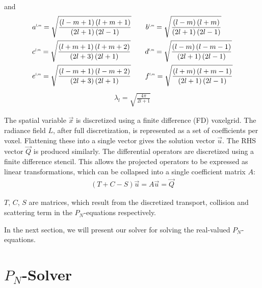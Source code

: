 and
\begin{align*}
&
a^{\scaleto{l,m}{4pt}}= \sqrt{\frac{\left(l-m+1\right)\left(l+m+1\right)}{\left(2l+1\right)\left(2l-1\right)}} \qquad
b^{\scaleto{l,m}{4pt}}= \sqrt{\frac{\left(l-m\right)\left(l+m\right)}{\left(2l+1\right)\left(2l-1\right)}}
\\&
c^{\scaleto{l,m}{4pt}}= \sqrt{\frac{\left(l+m+1\right)\left(l+m+2\right)}{\left(2l+3\right)\left(2l+1\right)}} \qquad
d^{\scaleto{l,m}{4pt}}= \sqrt{\frac{\left(l-m\right)\left(l-m-1\right)}{\left(2l+1\right)\left(2l-1\right)}}
\\&
e^{\scaleto{l,m}{4pt}}= \sqrt{\frac{\left(l-m+1\right)\left(l-m+2\right)}{\left(2l+3\right)\left(2l+1\right)}} \qquad
f^{\scaleto{l,m}{4pt}}= \sqrt{\frac{\left(l+m\right)\left(l+m-1\right)}{\left(2l+1\right)\left(2l-1\right)}}
\end{align*}
\begin{align*}
\lambda_l=\sqrt{\frac{4\pi}{2l+1}}
\end{align*}

The spatial variable $\vec{x}$ is discretized using a finite difference (FD) voxelgrid. The radiance field $L$, after full discretization, is represented as a set of coefficients per voxel. Flattening these into a single vector gives the solution vector $\vec{u}$. The RHS vector $\vec{Q}$ is produced similarly. The differential operators are discretized using a finite difference stencil. This allows the projected operators to be expressed as linear transformations, which can be collapsed into a single coefficient matrix $A$:
\begin{align}
(T+C-S)\vec{u} = A\vec{u} = \vec{Q}
\end{align}

$T$, $C$, $S$ are matrices, which result from the discretized transport, collision and scattering term in the $P_N$-equations respectively.

\begin{figure}[h]
\centering
{}
\end{figure}

In the next section, we will present our solver for solving the real-valued $P_N$-equations. 

\section{$P_N$-Solver}
\label{sec:pnsolver}

